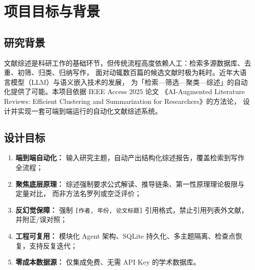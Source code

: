 \documentclass[10pt,a4paper]{article}
\begin{document}
\section{项目目标与背景}

\subsection{研究背景}
文献综述是科研工作的基础环节，但传统流程高度依赖人工：检索多源数据库、去重、初筛、归类、归纳写作，
面对动辄数百篇的候选文献时极为耗时。近年大语言模型（LLM）与语义嵌入技术的发展，
为「检索—筛选—聚类—综述」的自动化提供了可能。本项目依据 IEEE Access 2025 论文
《AI-Augmented Literature Reviews: Efficient Clustering and Summarization for Researchers》的方法论，
设计并实现一套可端到端运行的自动化文献综述系统。

\subsection{设计目标}
\begin{enumerate}[leftmargin=2.2em,itemsep=0.1em]
  \item \textbf{端到端自动化：} 输入研究主题，自动产出结构化综述报告，覆盖检索到写作全流程；
  \item \textbf{聚焦底层原理：} 综述强制要求公式解读、推导链条、第一性原理理论极限与定量对比，
        而非方法名罗列或空泛评价；
  \item \textbf{反幻觉保障：} 强制 \texttt{[作者, 年份, 论文标题]} 引用格式，禁止引用列表外文献，并附正/误对照；
  \item \textbf{工程可复用：} 模块化 Agent 架构、SQLite 持久化、多主题隔离、检查点恢复，支持反复迭代；
  \item \textbf{零成本数据源：} 仅集成免费、无需 API Key 的学术数据库。
\end{enumerate}
\end{document}
